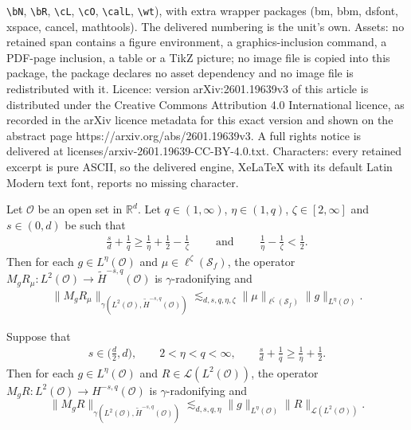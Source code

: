\documentclass[10pt,a4paper]{amsart}
\def\R{{\mathbb R}}
\newcommand\calL{\mathcal{L}}
\newcommand{\Domm}{\mathcal{O}}
\newcommand{\Sf}{\mathcal{S}_{f}}
\newcommand{\wt}{\widetilde}
\begin{document}
\texttt{\textbackslash bN}, \texttt{\textbackslash bR}, \texttt{\textbackslash cL}, \texttt{\textbackslash cO}, \texttt{\textbackslash calL}, \texttt{\textbackslash wt}), with extra wrapper packages (bm, bbm, dsfont, xspace, cancel, mathtools). The delivered numbering is the unit's own. Assets: no retained span contains a figure environment, a graphics-inclusion command, a PDF-page inclusion, a table or a TikZ picture; no image file is copied into this package, the package declares no asset dependency and no image file is redistributed with it. Licence: version arXiv:2601.19639v3 of this article is distributed under the Creative Commons Attribution 4.0 International licence, as recorded in the arXiv licence metadata for this exact version and shown on the abstract page https://arxiv.org/abs/2601.19639v3. A full rights notice is delivered at licenses/arxiv-2601.19639-CC-BY-4.0.txt. Characters: every retained excerpt is pure ASCII, so the delivered engine, XeLaTeX with its default Latin Modern text font, reports no missing character.
\begin{theorem}
\label{thm:MgTmu delta}
Let $\Domm$ be an open set in $\R^d$. 
Let $q\in (1, \infty)$, $\eta\in (1, q)$, $\zeta\in [2, \infty]$
and $s\in(0,d)$ be such that 
\begin{align}\label{eq:conditionsmain delta}
\frac{s}{d} + \frac{1}{q}  \geq \frac{1}{\eta} + \frac{1}{2} - \frac{1}{\zeta}\qquad \text{ and }\qquad 
\frac{1}{\eta} - \frac{1}{\zeta}<\frac{1}{2}.
\end{align}
Then for each $g\in L^{\eta}(\mathcal{O})$ and $\mu\in \ell^\zeta(\Sf)$, the operator 
$M_g R_{\mu}:L^2(\mathcal{O})\to \wt{H}^{-s,q}(\mathcal{O})$ is $\gamma$-radonifying
and 
\begin{align}\label{eq:maingammabound}
\|M_g R_{\mu}\|_{\gamma(L^2(\mathcal{O}), \wt{H}^{-s,q}(\mathcal{O}))}\lesssim_{d,s,q,\eta,\zeta} \|\mu\|_{\ell^{\zeta}(\Sf)} \|g\|_{L^{\eta}(\mathcal{O})}.
\end{align} 
\end{theorem}

\begin{lemma}
\label{lem:zetainfty}
Suppose that
\begin{align}
\label{eq:boundHsqsharp}
s\in \Big(\frac{d}{2},d\Big), 
\qquad 2<\eta<q<\infty, \qquad   \frac{s}{d} + \frac{1}{q} \geq \frac{1}{\eta}+\frac{1}{2}. 
\end{align}
Then for each $g\in L^{\eta}(\mathcal{O})$ and $R\in \calL(L^2(\mathcal{O}))$, the operator $M_g R:L^2(\mathcal{O})\to H^{-s,q}(\mathcal{O})$ is $\gamma$-radonifying and 
\begin{equation}
\label{eq:gamma_L2_Leta_endpoint}
\|M_g R\|_{\gamma(L^2(\mathcal{O}), \wt{H}^{-s,q}(\mathcal{O}))}\lesssim_{d,s,q,\eta} \|g\|_{L^\eta(\mathcal{O})} 
\|R\|_{\calL(L^2(\mathcal{O}))}.
\end{equation}
\end{lemma}
\end{document}
